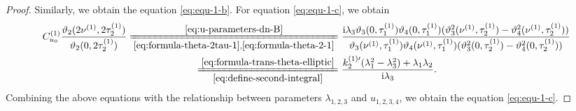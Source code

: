 \documentclass[11pt,reqno]{amsart}
\newcommand{\ii}{\mathrm{i}}
\numberwithin{equation}{section}
\begin{document}
\begin{proof}
		
		Similarly, we obtain the equation \eqref{eq:equ-1-b}.
			For equation \eqref{eq:equ-1-c}, we obtain
			\begin{equation}\nonumber
				\begin{split}
					C_{u_0}^{(1)}\frac{\vartheta_2(2 \nu^{(1)} ,2  \tau^{(1)}_2)}{\vartheta_2(0,2  \tau^{(1)}_2)}\xlongequal[\eqref{eq:formula-theta-2tau-1},\eqref{eq:formula-theta-2-1}]{\eqref{eq:u-parameters-dn-B}}&\
					\frac{\ii \lambda_3 \vartheta_3(0 ,  \tau^{(1)}_1)\vartheta_4( 0,  \tau^{(1)}_1)(\vartheta_3^2( \nu^{(1)} ,  \tau^{(1)}_2)-\vartheta_4^2( \nu^{(1)} ,  \tau^{(1)}_2))}{\vartheta_3( \nu^{(1)} ,  \tau^{(1)}_1)\vartheta_4( \nu^{(1)} ,  \tau^{(1)}_1)(\vartheta_3^2(0,  \tau^{(1)}_2)-\vartheta_4^2(0,  \tau^{(1)}_2))}\\
					\xlongequal[\eqref{eq:define-second-integral}]{\eqref{eq:formula-trans-theta-elliptic}}&\ \frac{  k^{(1)\prime}_2(\lambda_1^2-\lambda_3^2)+\lambda_1\lambda_2}{\ii\lambda_3}.
				\end{split}	
			\end{equation}
			 Combining the above equations with the relationship between parameters $\lambda_{1,2,3}$ and $u_{1,2,3,4}$, we obtain the equation \eqref{eq:equ-1-c}. 
\end{proof}
\end{document}
